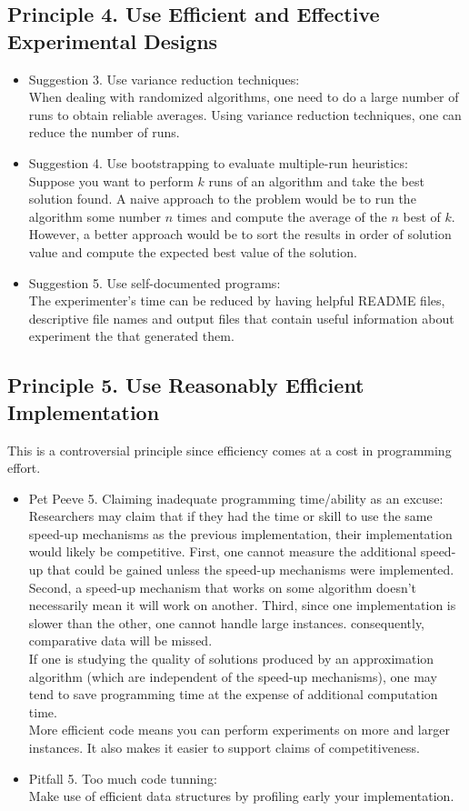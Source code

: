 \documentclass[]{scrartcl}
\begin{document}
\subsection*{Principle 4. Use Efficient and Effective Experimental Designs}
\begin{itemize}
	\item Suggestion 3. Use variance reduction techniques: \\
	When dealing with randomized algorithms, one need to do a large number of runs to obtain reliable averages. Using variance reduction techniques, one can reduce the number of runs.
	\item Suggestion 4. Use bootstrapping to evaluate multiple-run heuristics: \\
	Suppose you want to perform $k$ runs of an algorithm and take the best solution found. A naive approach to the problem would be to run the algorithm some number $n$ times and compute the average of the $n$ best of $k$. However, a better approach would be to sort the results in order of solution value and compute the expected best value of the solution.
	\item Suggestion 5. Use self-documented programs: \\
	The experimenter's time can be reduced by having helpful README files, descriptive file names and output files that contain useful information about experiment the that generated them.
\end{itemize}
\subsection*{Principle 5. Use Reasonably Efficient Implementation}
This is a controversial principle since efficiency comes at a cost in programming effort.
\begin{itemize}
	\item Pet Peeve 5. Claiming inadequate programming time/ability as an excuse: \\
	Researchers may claim that if they had the time or skill to use the same speed-up mechanisms as the previous implementation, their implementation would likely be competitive. First, one cannot measure the additional speed-up that could be gained unless the speed-up mechanisms were implemented. Second, a speed-up mechanism that works on some algorithm doesn't necessarily mean it will work on another. Third, since one implementation is slower than the other, one cannot handle large instances. consequently, comparative data will be missed. \\
	If one is studying the quality of solutions produced by an approximation algorithm (which are independent of the speed-up mechanisms), one may tend to save programming time at the expense of additional computation time. \\ More efficient code means you can perform experiments on more and larger instances. It also makes it easier to support claims of competitiveness.
	\item Pitfall 5. Too much code tunning: \\
	Make use of efficient data structures by profiling early your implementation.
\end{itemize}
\end{document}
